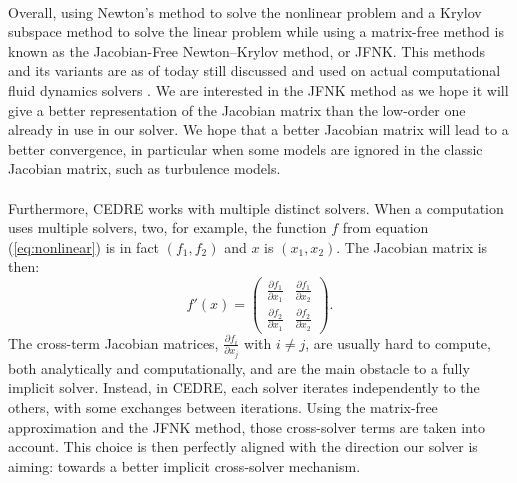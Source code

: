       \paragraph{}
      Overall, using Newton's method to solve the nonlinear problem and a Krylov subspace method to solve the linear problem while using a matrix-free method is known as the Jacobian-Free Newton--Krylov method, or JFNK.
      This methods and its variants are as of today still discussed \cite{AnWenFeng2011, Turpault2003} and used on actual computational fluid dynamics solvers \cite{LiuZhangZhongEtAl2015, FrancoCamierAndrejEtAl2020}.
      We are interested in the JFNK method as we hope it will give a better representation of the Jacobian matrix than the low-order one already in use in our solver.
      We hope that a better Jacobian matrix will lead to a better convergence, in particular when some models are ignored in the classic Jacobian matrix, such as turbulence models.

      \paragraph{}
      Furthermore, CEDRE works with multiple distinct solvers.
      When a computation uses multiple solvers, two, for example, the function $f$ from equation (\ref{eq:nonlinear}) is in fact $\left(f_1, f_2\right)$ and $x$ is $\left(x_1, x_2\right)$.
      The Jacobian matrix is then:
      \begingroup
      \renewcommand*{\arraystretch}{1.5}
      \begin{equation}
        f'\left(x\right) = \begin{pmatrix} \frac{\partial f_1}{\partial x_1} & \frac{\partial f_1}{\partial x_2} \\ \frac{\partial f_2}{\partial x_1} & \frac{\partial f_2}{\partial x_2} \end{pmatrix} .
      \end{equation}
      \endgroup
      The cross-term Jacobian matrices, $\frac{\partial f_i}{\partial x_j}$ with $i \ne j$, are usually hard to compute, both analytically and computationally, and are the main obstacle to a fully implicit solver.
      Instead, in CEDRE, each solver iterates independently to the others, with some exchanges between iterations.
      Using the matrix-free approximation and the JFNK method, those cross-solver terms are taken into account.
      This choice is then perfectly aligned with the direction our solver is aiming: towards a better implicit cross-solver mechanism.

